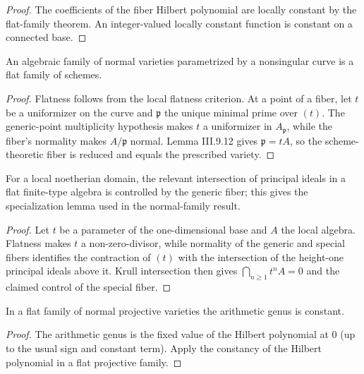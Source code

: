\begin{proof}

The coefficients of the fiber Hilbert polynomial are locally constant by the flat-family theorem.
An integer-valued locally constant function is constant on a connected base.

\end{proof}
\begin{theorem}\label{ha-ch3-thm-normal-family}
An algebraic family of normal varieties parametrized by a nonsingular curve is
a flat family of schemes.
\end{theorem}
\begin{proof}

Flatness follows from the local flatness criterion.  At a point of a fiber,
let $t$ be a uniformizer on the curve and $\mathfrak p$ the unique minimal
prime over $(t)$.  The generic-point multiplicity hypothesis makes $t$ a
uniformizer in $A_{\mathfrak p}$, while the fiber's normality makes
$A/\mathfrak p$ normal.  Lemma III.9.12 gives $\mathfrak p=tA$, so the
scheme-theoretic fiber is reduced and equals the prescribed variety.

\end{proof}
\begin{lemma}[Hironaka]\label{ha-ch3-lem-hironaka}
For a local noetherian domain, the relevant intersection of principal ideals
in a flat finite-type algebra is controlled by the generic fiber; this gives
the specialization lemma used in the normal-family result.

\end{lemma}
\begin{proof}

Let $t$ be a parameter of the one-dimensional base and $A$ the local algebra.  Flatness makes $t$
 a non-zero-divisor, while normality of the generic and special fibers identifies the contraction of
 $(t)$ with the intersection of the height-one principal ideals above it.  Krull intersection then
 gives $\bigcap_{n\ge1}t^nA=0$ and the claimed control of the special fiber.

\end{proof}

\begin{corollary}\label{ha-ch3-cor-normal-genus}
In a flat family of normal projective varieties the arithmetic genus is
constant.

\end{corollary}
\begin{proof}

The arithmetic genus is the fixed value of the Hilbert polynomial at $0$ (up to the usual sign and
constant term).  Apply the constancy of the Hilbert polynomial in a flat projective family.

\end{proof}

